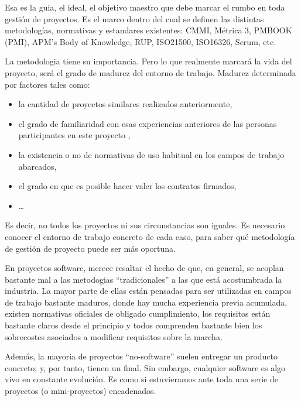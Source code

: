 \documentclass[spanish,12pt,a4paper,final,oneside]{book}
\begin{document}
Esa es la guia, el ideal, el objetivo maestro que debe marcar el rumbo en toda gestión de proyectos. Es el marco dentro del cual se definen las distintas metodologías, normativas y estandares existentes: CMMI, Métrica 3, PMBOOK (PMI), APM’s Body of Knowledge, RUP, ISO21500, ISO16326, Scrum, etc.

La metodologia tiene su importancia. Pero lo que realmente marcará la vida del proyecto, será el grado de madurez del entorno de trabajo. Madurez determinada por factores tales como: 
\begin{itemize}
\item la cantidad de proyectos similares realizados anteriormente, 
\item el grado de familiaridad con esas experiencias anteriores de las personas participantes en este proyecto , 
\item la existencia o no de normativas de uso habitual en los campos de trabajo abarcados, 
\item el grado en que es posible hacer valer los contratos firmados,
\item \ldots
\end{itemize}

Es decir, no todos los proyectos ni sus circunstancias son iguales. Es necesario conocer el entorno de trabajo concreto de cada caso, para saber qué metodología de gestión de proyecto puede ser más oportuna.

En proyectos software, merece resaltar el hecho de que, en general, se acoplan bastante mal a las metodogias ``tradicionales'' a las que está acostumbrada la industria. La mayor parte de ellas están pensadas para ser utilizadas en campos de trabajo bastante maduros, donde hay mucha experiencia previa acumulada, existen normativas oficiales de obligado cumplimiento, los requisitos están bastante claros desde el principio y todos comprenden bastante bien los sobrecostes asociados a modificar requisitos sobre la marcha.

Además, la mayoria de proyectos ``no-software'' suelen entregar un producto concreto; y, por tanto, tienen un final. Sin embargo, cualquier software es algo vivo en constante evolución. Es como si estuvieramos ante toda una serie de proyectos (o mini-proyectos) encadenados.
\end{document}
